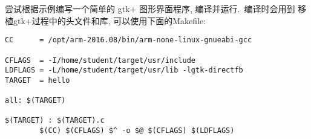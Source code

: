     尝试根据示例编写一个简单的 gtk+ 图形界面程序, 编译并运行.~编译时会用到
移植gtk+过程中的头文件和库, 可以使用下面的Makefile:

\begin{boxedminipage}{.9\textwidth}
\lstset{language=make}
\begin{lstlisting}
CC      = /opt/arm-2016.08/bin/arm-none-linux-gnueabi-gcc

CFLAGS  = -I/home/student/target/usr/include
LDFLAGS = -L/home/student/target/usr/lib -lgtk-directfb
TARGET  = hello

all: $(TARGET)

$(TARGET) : $(TARGET).c
        $(CC) $(CFLAGS) $^ -o $@ $(CFLAGS) $(LDFLAGS)

\end{lstlisting}
\end{boxedminipage}

